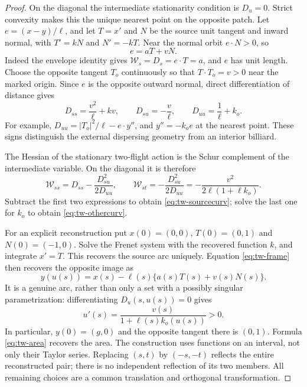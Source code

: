 \begin{proof}
On the diagonal the intermediate stationarity condition is $D_u=0$.
Strict convexity makes this the unique nearest point on the opposite
patch. Let $e=(x-y)/\ell$, and let $T=x'$ and $N$ be the source
unit tangent and inward normal, with $T'=kN$ and $N'=-kT$.
Near the normal orbit $e\cdot N>0$, so
\begin{equation}\label{eq:tw-frame}
                  e=aT+vN.
\end{equation}
Indeed the envelope identity gives $\mathcal W_s=D_s=e\cdot T=a$,
and $e$ has unit length. Choose the opposite tangent $T_o$ continuously
so that $T\cdot T_o=v>0$ near the marked origin. Since $e$ is the
opposite outward normal, direct differentiation of distance gives
\begin{equation}\label{eq:tw-distancehessian}
 D_{ss}=\frac{v^2}{\ell}+kv,\qquad
 D_{su}=-\frac v\ell,\qquad
 D_{uu}=\frac1\ell+k_o.
\end{equation}
For example, $D_{uu}=|T_o|^2/\ell-e\cdot y''$, and
$y''=-k_oe$ at the nearest point. These signs distinguish the
external dispersing geometry from an interior billiard.

The Hessian of the stationary two-flight action is the Schur complement
of the intermediate variable. On the diagonal it is therefore
\begin{equation}\label{eq:tw-schur}
 \mathcal W_{ss}=D_{ss}-\frac{D_{su}^2}{2D_{uu}},\qquad
 \mathcal W_{st}=-\frac{D_{su}^2}{2D_{uu}}
               =-\frac{v^2}{2\ell(1+\ell k_o)}.
\end{equation}
Subtract the first two expressions to obtain
\eqref{eq:tw-sourcecurv}; solve the last one for $k_o$ to obtain
\eqref{eq:tw-othercurv}.

For an explicit reconstruction put $x(0)=(0,0)$, $T(0)=(0,1)$ and
$N(0)=(-1,0)$. Solve the Frenet system with the recovered function $k$,
and integrate $x'=T$. This recovers the source arc uniquely. Equation
\eqref{eq:tw-frame} then recovers the opposite image as
\begin{equation}\label{eq:tw-foot}
             y(u(s))=x(s)-\ell(s)\{a(s)T(s)+v(s)N(s)\}.
\end{equation}
It is a genuine arc, rather than only a set with a possibly singular
parametrization: differentiating $D_u(s,u(s))=0$ gives
\begin{equation}\label{eq:tw-footspeed}
           u'(s)=\frac{v(s)}{1+\ell(s)k_o(u(s))}>0.
\end{equation}
In particular, $y(0)=(g,0)$ and the opposite tangent there is $(0,1)$.
Formula \eqref{eq:tw-area} recovers the area. The construction uses
functions on an interval, not only their Taylor series. Replacing
$(s,t)$ by $(-s,-t)$ reflects the entire reconstructed pair; there is
no independent reflection of its two members. All remaining choices
are a common translation and orthogonal transformation.
\end{proof}

